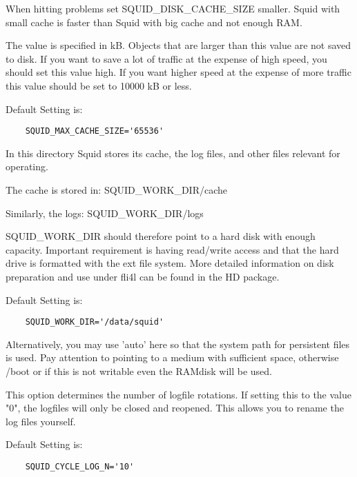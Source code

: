 \begin{description}
		When hitting problems set SQUID\_DISK\_CACHE\_SIZE smaller.
		Squid with small cache is faster than Squid with big cache and
		not enough RAM.



		The value is specified in kB. Objects that are larger than
		this value are not saved to disk. If you want to save a lot
		of traffic at the expense of high speed, you should set this
		value high. If you want higher speed at the expense of more traffic
		this value should be set to 10000 kB or less.

                Default Setting is:
\begin{verbatim}
	SQUID_MAX_CACHE_SIZE='65536'
\end{verbatim}



		In this directory Squid stores its cache, the log files,
		and other files relevant for operating.

		The cache is stored in:
				SQUID\_WORK\_DIR/cache

		Similarly, the logs:
				SQUID\_WORK\_DIR/logs

		SQUID\_WORK\_DIR should therefore point to a hard disk with enough
		capacity. Important requirement is having read/write access
		and that the hard drive is formatted with the ext file system.
		More detailed information on disk preparation and use under fli4l
		can be found in the HD package.

                Default Setting is:
\begin{verbatim}
	SQUID_WORK_DIR='/data/squid'
\end{verbatim}

		Alternatively, you may use 'auto' here so that the system path
		for persistent files is used. Pay attention to 
		pointing to a medium with sufficient space, otherwise /boot or if
		this is not writable even the RAMdisk will be used.


		This option determines the number of logfile rotations. If
		setting this to the value "0", the logfiles will only be
		closed and reopened. This allows you to rename the log files
		yourself.

                Default Setting is:
\begin{verbatim}
	SQUID_CYCLE_LOG_N='10'
\end{verbatim}


\end{description}
